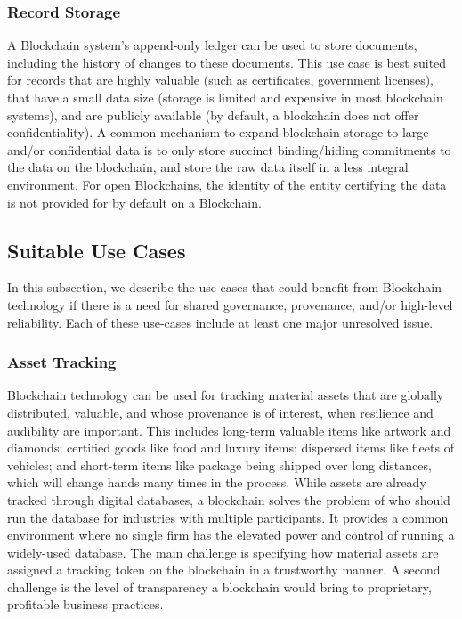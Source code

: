 \subsubsection{Record Storage} %
A Blockchain system's append-only ledger can be used to store documents, including the history of changes to these documents.
This use case is best suited for records that are highly valuable (such as certificates, government licenses), that have a small data size (storage is limited and expensive in most blockchain systems), and are publicly available (by default, a blockchain does not offer confidentiality).
A common mechanism to expand blockchain storage to large and/or confidential data is to only store succinct binding/hiding commitments to the data on the blockchain, and store the raw data itself in a less integral environment.
For open Blockchains, the identity of the entity certifying the data is not provided for by default on a Blockchain.


\subsection{Suitable Use Cases}
In this subsection, we describe the use cases that could benefit from Blockchain technology if there is a need for shared governance, provenance, and/or high-level reliability. Each of these use-cases include at least one major unresolved issue.

\subsubsection{Asset Tracking} 
Blockchain technology can be used for tracking material assets that are globally distributed, valuable, and whose provenance is of interest, when resilience and audibility are important. This includes long-term valuable items like artwork and diamonds; certified goods like food and luxury items; dispersed items like fleets of vehicles; and short-term items like package being shipped over long distances, which will change hands many times in the process. While assets are already tracked through digital databases, a blockchain solves the problem of who should run the database for industries with multiple participants. It provides a common environment where no single firm has the elevated power and control of running a widely-used database. The main challenge is specifying how material assets are assigned a tracking token on the blockchain in a trustworthy manner. A second challenge is the level of transparency a blockchain would bring to proprietary, profitable business practices. 

